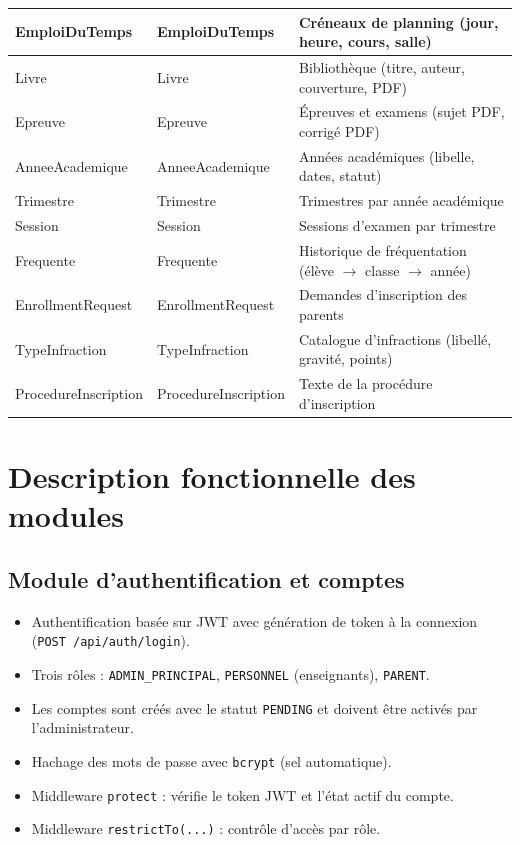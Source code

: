 \documentclass[12pt,a4paper]{report}
\begin{document}
\begin{longtable}{|p{3cm}|p{4cm}|p{7.5cm}|}
\hline
EmploiDuTemps & EmploiDuTemps & Créneaux de planning (jour, heure, cours, salle) \\
\hline
Livre & Livre & Bibliothèque (titre, auteur, couverture, PDF) \\
\hline
Epreuve & Epreuve & Épreuves et examens (sujet PDF, corrigé PDF) \\
\hline
AnneeAcademique & AnneeAcademique & Années académiques (libelle, dates, statut) \\
\hline
Trimestre & Trimestre & Trimestres par année académique \\
\hline
Session & Session & Sessions d'examen par trimestre \\
\hline
Frequente & Frequente & Historique de fréquentation (élève $\rightarrow$ classe $\rightarrow$ année) \\
\hline
EnrollmentRequest & EnrollmentRequest & Demandes d'inscription des parents \\
\hline
TypeInfraction & TypeInfraction & Catalogue d'infractions (libellé, gravité, points) \\
\hline
ProcedureInscription & ProcedureInscription & Texte de la procédure d'inscription \\
\hline
\end{longtable}
 
\chapter{Description fonctionnelle des modules}
 
\section{Module d'authentification et comptes}
\begin{itemize}[leftmargin=*]
    \item Authentification basée sur JWT avec génération de token à la connexion (\texttt{POST /api/auth/login}).
    \item Trois rôles : \texttt{ADMIN\_PRINCIPAL}, \texttt{PERSONNEL} (enseignants), \texttt{PARENT}.
    \item Les comptes sont créés avec le statut \texttt{PENDING} et doivent être activés par l'administrateur.
    \item Hachage des mots de passe avec \texttt{bcrypt} (sel automatique).
    \item Middleware \texttt{protect} : vérifie le token JWT et l'état actif du compte.
    \item Middleware \texttt{restrictTo(...)} : contrôle d'accès par rôle.
\end{itemize}
 
\end{document}

